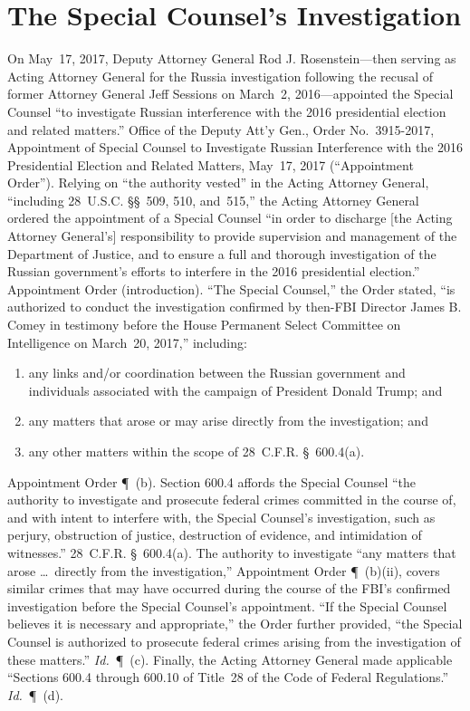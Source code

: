 \section{The Special Counsel's Investigation}

On May~17, 2017, Deputy Attorney General Rod J. Rosenstein---then serving as Acting Attorney General for the Russia investigation following the recusal of former Attorney General Jeff Sessions on March~2, 2016---appointed the Special Counsel ``to investigate Russian interference with the 2016 presidential election and related matters.''
Office of the Deputy Att'y Gen., Order No.~3915-2017, Appointment of Special Counsel to Investigate Russian Interference with the 2016 Presidential Election and Related Matters, May~17, 2017 (``Appointment Order'').
Relying on ``the authority vested'' in the Acting Attorney General, ``including 28~U.S.C. \S\S~509, 510, and~515,'' the Acting Attorney General ordered the appointment of a Special Counsel ``in order to discharge [the Acting Attorney General's] responsibility to provide supervision and management of the Department of Justice, and to ensure a full and thorough investigation of the Russian government's efforts to interfere in the 2016 presidential election.'' Appointment Order (introduction).
``The Special Counsel,'' the Order stated, ``is authorized to conduct the investigation confirmed by then-FBI Director James B. Comey in testimony before the House Permanent Select Committee on Intelligence on March~20, 2017,'' including:

\begin{enumerate}[i]
  \item any links and/or coordination between the Russian government and individuals associated with the campaign of President Donald Trump; and
  \item any matters that arose or may arise directly from the investigation; and
  \item any other matters within the scope of 28~C.F.R. \S~600.4(a).
\end{enumerate}

Appointment Order \P~(b). Section 600.4 affords the Special Counsel ``the authority to investigate and prosecute federal crimes committed in the course of, and with intent to interfere with, the Special Counsel's investigation, such as perjury, obstruction of justice, destruction of evidence, and intimidation of witnesses.'' 28~C.F.R. \S~600.4(a).
The authority to investigate ``any matters that arose \dots\ directly from the investigation,'' Appointment Order \P~(b)(ii), covers similar crimes that may have occurred during the course of the FBI's confirmed investigation before the Special Counsel's appointment.
``If the Special Counsel believes it is necessary and appropriate,'' the Order further provided, ``the Special Counsel is authorized to prosecute federal crimes arising from the investigation of these matters.'' \textit{Id.}~\P~(c).
Finally, the Acting Attorney General made applicable ``Sections 600.4 through 600.10 of Title~28 of the Code of Federal Regulations.'' \textit{Id.}~\P~(d).

